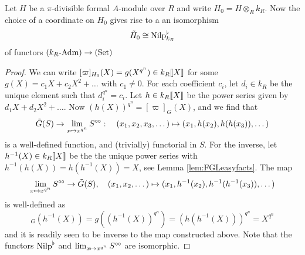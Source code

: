 \documentclass[../main.tex]{subfiles}
\begin{document}
\begin{lem}
  Let $H$ be a $\pi$-divisible formal $A$-module over $R$ and write $H_0 = H
  \otimes_R k_R$. Now the choice of a coordinate on $H_0$ gives rise to a
  an isomorphism 
  \begin{equation*}
    \tilde H_0 \cong {\mathrm{Nilp}}^\flat_{k_R}
  \end{equation*}
  of functors ${({k_R}\text-\mathrm{Adm})} \to {(\mathrm{Set})}$
\begin{proof}
  We can write $[\varpi]_{H_0}(X) = g(X^{q^n}) \in k_R\llbracket X \rrbracket$ for some 
  $g(X) = c_1X + c_2X^2 + \dots$ with $c_1 \neq 0$. For each coefficient $c_i$, let
  $d_i \in k_R$ be the unique element such that $d_i^{q^n} = c_i$. Let
  $h \in k_R\llbracket X \rrbracket$ be the power series given by $d_1 X + d_2
  X^2 + \dots$. Now $(h(X))^{q^n}=[\varpi]_G(X)$, and we find that 
  \begin{equation*}
      \tilde G(S) \to \lim_{x \mapsto x^{q^n}} S^{\circ \hspace{-0.5pt} \circ}: \quad
      (x_1, x_2, x_3, \dots) \mapsto (x_1, h(x_2), h(h(x_3)), \dots)
  \end{equation*}
  is a well-defined function, and (trivially) functorial in $S$. For the
  inverse, let $h^{-1}(X) \in k_R\llbracket X \rrbracket$ be the the unique power
  series with $h^{-1}(h(X))= h(h^{-1}(X)) = X$, see Lemma
  \ref{lem:FGLeasyfacts}. The map
  \begin{equation*}
      \lim_{x \mapsto x^{q^n}} S^{\circ \hspace{-0.5pt} \circ} \to \tilde G(S), \quad 
      (x_1, x_2, \dots ) \mapsto (x_1, h^{-1}(x_2), h^{-1}(h^{-1}(x_3)), \dots)
  \end{equation*}
  is well-defined as
  \begin{equation*}
      [\varpi]_G(h^{-1}(X)) = g((h^{-1}(X))^{q^n}) = (h(h^{-1}(X)))^{q^n} =
      X^{q^n}
  \end{equation*}
  and it is readily seen to be inverse to the map constructed above.
  Note that the functors ${\mathrm{Nilp}}^\flat$ and $\lim_{x \mapsto x^{q^n}} S^{\circ \hspace{-0.5pt} \circ}$
  are isomorphic.
\end{proof}
\end{lem}
\end{document}
